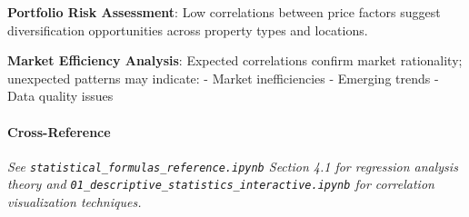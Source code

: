 \documentclass[11pt]{article}
\begin{document}
\textbf{Portfolio Risk Assessment}: Low correlations between price
factors suggest diversification opportunities across property types and
locations.

\textbf{Market Efficiency Analysis}: Expected correlations confirm
market rationality; unexpected patterns may indicate: - Market
inefficiencies - Emerging trends - Data quality issues

\paragraph{Cross-Reference}\label{cross-reference}

\emph{See \texttt{statistical\_formulas\_reference.ipynb} Section 4.1
for regression analysis theory and
\texttt{01\_descriptive\_statistics\_interactive.ipynb} for correlation
visualization techniques.}
\end{document}
